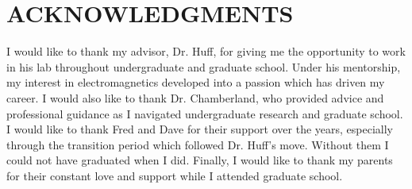 %
%
%
%


\chapter*{ACKNOWLEDGMENTS}


\indent I would like to thank my advisor, Dr. Huff, for giving me the opportunity to work in his lab throughout undergraduate and graduate school. Under his mentorship, my interest in electromagnetics developed into a passion which has driven my career. I would also like to thank Dr. Chamberland, who provided advice and professional guidance as I navigated undergraduate research and graduate school. I would like to thank Fred and Dave for their support over the years, especially through the transition period which followed Dr. Huff's move. Without them I could not have graduated when I did. Finally, I would like to thank my parents for their constant love and support while I attended graduate school. 

\pagebreak{}